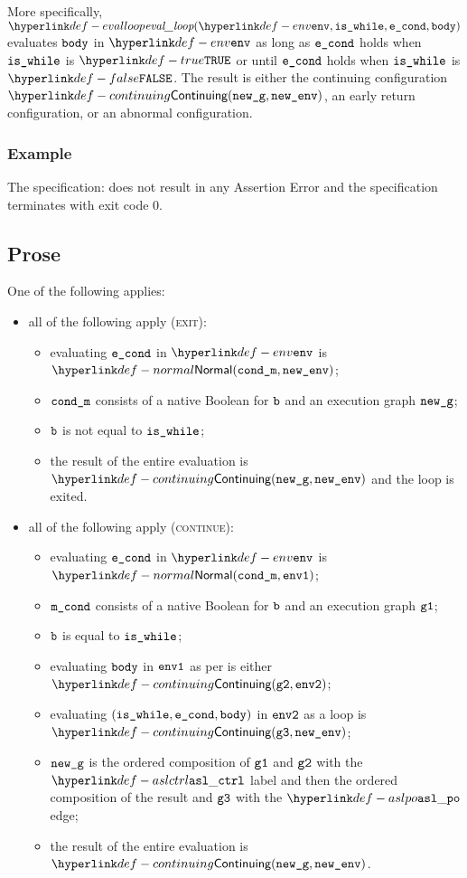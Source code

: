 More specifically, $\evalloop{\env, \iswhile, \econd, \vbody}$
evaluates $\texttt{body}$ in $\env$ as long as $\texttt{e\_cond}$ holds when $\texttt{is\_while}$ is $\True$
or until $\texttt{e\_cond}$ holds when $\texttt{is\_while}$ is $\False$.
The result is either the continuing configuration \\ $\Continuing(\newg,\newenv)$,
an early return configuration, or an abnormal configuration.

\subsubsection{Example}
The specification:
does not result in any Assertion Error and the specification terminates with exit
code $0$.

\subsection{Prose}
One of the following applies:
\begin{itemize}
\item all of the following apply (\textsc{exit}):
  \begin{itemize}
    \item evaluating $\texttt{e\_cond}$ in $\env$ is $\Normal(\condm, \newenv)$\ProseOrAbnormal;
    \item $\texttt{cond\_m}$ consists of a native Boolean for $\texttt{b}$ and an execution graph $\texttt{new\_g}$;
    \item $\texttt{b}$ is not equal to $\texttt{is\_while}$;
    \item the result of the entire evaluation is $\Continuing(\newg, \newenv)$
    and the loop is exited.
  \end{itemize}
\item all of the following apply (\textsc{continue}):
  \begin{itemize}
    \item evaluating $\texttt{e\_cond}$ in $\env$ is $\Normal(\condm, \envone)$;
    \item $\texttt{m\_cond}$ consists of a native Boolean for $\texttt{b}$ and an execution graph $\texttt{g1}$;
    \item $\texttt{b}$ is equal to $\texttt{is\_while}$;
    \item evaluating $\texttt{body}$ in $\texttt{env1}$ as per  is either \\
    $\Continuing(\vgtwo, \envtwo)$\ProseTerminateAs{\ReturningConfig, \ThrowingConfig, \ErrorConfig};
    \item evaluating $(\texttt{is\_while}, \texttt{e\_cond}, \texttt{body})$ in $\texttt{env2}$ as a loop is \\
    $\Continuing(\vgthree, \newenv)$\ProseTerminateAs{\ReturningConfig, \ThrowingConfig, \ErrorConfig};
    \item $\texttt{new\_g}$ is the ordered composition of $\texttt{g1}$ and $\texttt{g2}$ with the $\aslctrl$ label
    and then the ordered composition of the result and $\texttt{g3}$ with the $\aslpo$ edge;
    \item the result of the entire evaluation is $\Continuing(\newg, \newenv)$.
  \end{itemize}
\end{itemize}

